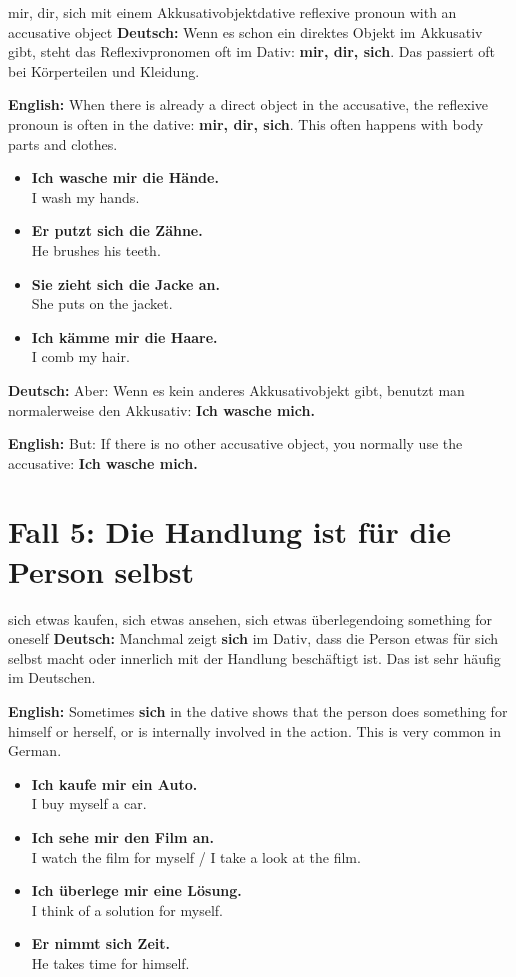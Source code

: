 \documentclass[a4paper,11pt]{article}
\newcommand{\GermanText}[1]{\textbf{Deutsch: }#1\par}
\newcommand{\EnglishText}[1]{{\small\color{SoftGray}\textbf{English: }#1\par}}
\newcommand{\ExampleItem}[2]{\item \textbf{#1}\\{\small\color{SoftGray}#2}}
\begin{document}
        \begin{grammarentry}{mir, dir, sich mit einem Akkusativobjekt}{dative reflexive pronoun with an accusative object}
            \GermanText{Wenn es schon ein direktes Objekt im Akkusativ gibt, steht das Reflexivpronomen oft im Dativ: \textbf{mir, dir, sich}. Das passiert oft bei Körperteilen und Kleidung.}
            \EnglishText{When there is already a direct object in the accusative, the reflexive pronoun is often in the dative: \textbf{mir, dir, sich}. This often happens with body parts and clothes.}
            
            \begin{exbox}
                \begin{itemize}
                    \ExampleItem{Ich wasche mir die Hände.}{I wash my hands.}
                    \ExampleItem{Er putzt sich die Zähne.}{He brushes his teeth.}
                    \ExampleItem{Sie zieht sich die Jacke an.}{She puts on the jacket.}
                    \ExampleItem{Ich kämme mir die Haare.}{I comb my hair.}
                \end{itemize}
            \end{exbox}
            
            \GermanText{Aber: Wenn es kein anderes Akkusativobjekt gibt, benutzt man normalerweise den Akkusativ: \textbf{Ich wasche mich.}}
            \EnglishText{But: If there is no other accusative object, you normally use the accusative: \textbf{Ich wasche mich.}}
        \end{grammarentry}
    
    
    \section{Fall 5: Die Handlung ist für die Person selbst}
        
        \begin{grammarentry}{sich etwas kaufen, sich etwas ansehen, sich etwas überlegen}{doing something for oneself}
            \GermanText{Manchmal zeigt \textbf{sich} im Dativ, dass die Person etwas für sich selbst macht oder innerlich mit der Handlung beschäftigt ist. Das ist sehr häufig im Deutschen.}
            \EnglishText{Sometimes \textbf{sich} in the dative shows that the person does something for himself or herself, or is internally involved in the action. This is very common in German.}
            
            \begin{exbox}
                \begin{itemize}
                    \ExampleItem{Ich kaufe mir ein Auto.}{I buy myself a car.}
                    \ExampleItem{Ich sehe mir den Film an.}{I watch the film for myself / I take a look at the film.}
                    \ExampleItem{Ich überlege mir eine Lösung.}{I think of a solution for myself.}
                    \ExampleItem{Er nimmt sich Zeit.}{He takes time for himself.}
                \end{itemize}
            \end{exbox}
        \end{grammarentry}
    
\end{document}
